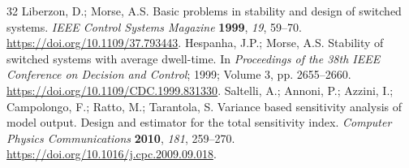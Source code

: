 \documentclass[machines,article,submit,pdftex,moreauthors]{Definitions/mdpi}
\begin{document}
\begin{thebibliography}{32}
 Liberzon, D.; Morse, A.S. Basic problems in stability and design of switched systems. \emph{IEEE Control Systems Magazine} \textbf{1999}, \emph{19}, 59--70. \url{https://doi.org/10.1109/37.793443}.
 Hespanha, J.P.; Morse, A.S. Stability of switched systems with average dwell-time. In \emph{Proceedings of the 38th IEEE Conference on Decision and Control}; 1999; Volume 3, pp. 2655--2660. \url{https://doi.org/10.1109/CDC.1999.831330}.
 Saltelli, A.; Annoni, P.; Azzini, I.; Campolongo, F.; Ratto, M.; Tarantola, S. Variance based sensitivity analysis of model output. Design and estimator for the total sensitivity index. \emph{Computer Physics Communications} \textbf{2010}, \emph{181}, 259--270. \url{https://doi.org/10.1016/j.cpc.2009.09.018}.
\end{thebibliography}
\end{document}
